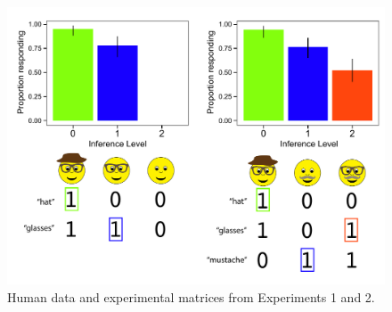 \begin{figure}
  \centering
\includegraphics[width=4.75in]{fig/ann-ibr-bargraph.pdf}
\caption{\label{fig:humans} Human data and experimental matrices from Experiments 1 and 2.}
\end{figure}


